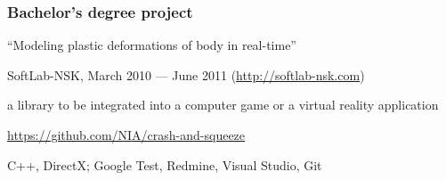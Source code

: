 \documentclass[a4paper, 12pt]{article}
\begin{document}
  \subsubsection*{Bachelor's degree project}
  \begin{description}[labelindent=1em] %
    \item[Topic:] ``Modeling plastic deformations of body in real-time''
    \item[Company:] SoftLab-NSK, March 2010 — June 2011 (\url{http://softlab-nsk.com})
    \item[Description:] a library to be integrated into a computer game or a virtual reality application
    \item[Source code:] \url{https://github.com/NIA/crash-and-squeeze}
    \item[Technologies and tools:] C++, DirectX; Google Test, Redmine, Visual Studio, Git
  \end{description}
\end{document}
